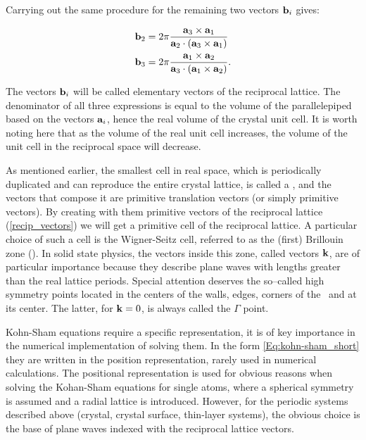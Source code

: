 Carrying out the same procedure for the remaining two vectors $\mathbf{b}_i$ gives:

\begin{equation}
    \begin{aligned}
        \mathbf{b}_2&=2\pi\frac{\mathbf{a}_3\times\mathbf{a}_1}{\mathbf{a}_2\cdot \left(\mathbf{a}_3\times\mathbf{a}_1\right)}\\
        \mathbf{b}_3&=2\pi\frac{\mathbf{a}_1\times\mathbf{a}_2}{\mathbf{a}_3\cdot \left(\mathbf{a}_1\times\mathbf{a}_2\right)}.
    \end{aligned}
    \label{recip_vectors}
\end{equation}

The vectors $\mathbf{b}_i$ will be called elementary vectors of the reciprocal lattice.
The denominator of all three expressions is equal to the volume of the parallelepiped based on the vectors $\mathbf{a}_i$, hence the real volume of the crystal unit cell.
It is worth noting here that as the volume of the real unit cell increases, the volume of the unit cell in the reciprocal space will decrease.

As mentioned earlier, the smallest cell in real space, which is periodically duplicated and can reproduce the entire crystal lattice, is called a \prim, and the vectors that compose it are primitive translation vectors (or simply primitive vectors).
By creating with them primitive vectors of the reciprocal lattice (\ref{recip_vectors}) we will get a primitive cell of the reciprocal lattice.
A particular choice of such a cell is the Wigner-Seitz cell, referred to as the (first) Brillouin zone (\BZ).
In solid state physics, the vectors inside this zone, called vectors $\mathbf{k}$, are of particular importance because they describe plane waves with lengths greater than the real lattice periods.
Special attention deserves the so--called high symmetry points located in the centers of the walls, edges, corners of the \BZ\ and at its center.
The latter, for $\mathbf{k}=0$, is always called the $\Gamma$ point.

Kohn-Sham equations require a specific representation, it is of key importance in the numerical implementation of solving them.
In the form \ref{Eq:kohn-sham_short} they are written in the position representation, rarely used in numerical calculations.
The positional representation is used for obvious reasons when solving the Kohan-Sham equations for single atoms, where a spherical symmetry is assumed and a radial lattice is introduced.
However, for the periodic systems described above (crystal, crystal surface, thin-layer systems), the obvious choice is the base of plane waves indexed with the reciprocal lattice vectors.

